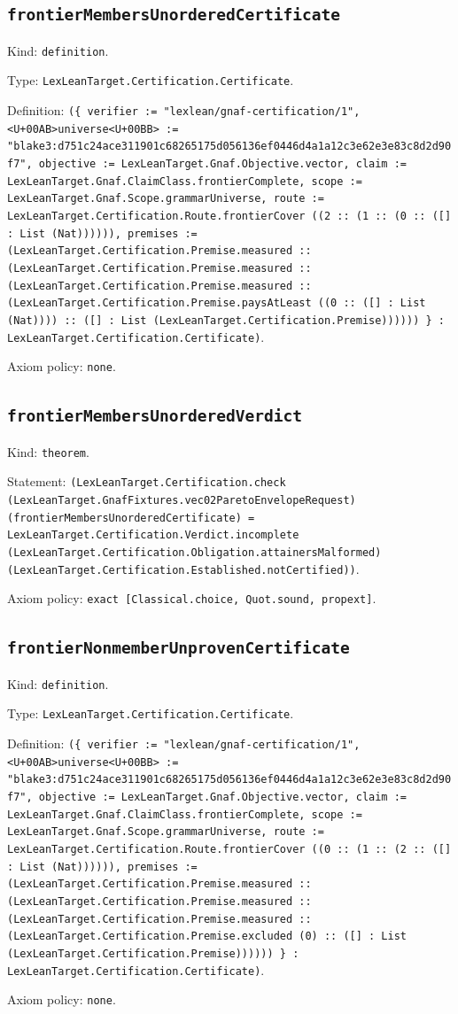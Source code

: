 \documentclass[11pt]{article}
\begin{document}
\subsection*{\texttt{frontierMembersUnorderedCertificate}}
\noindent Kind: \texttt{definition}.\par
\noindent Type: \texttt{LexLeanTarget.Certification.Certificate}.\par
\noindent Definition: \texttt{(\{ verifier := "lexlean/gnaf-certification/1", <U+00AB>universe<U+00BB> := "blake3:d751c24ace311901c68265175d056136ef0446d4a1a12c3e62e3e83c8d2d90f7", objective := LexLeanTarget.Gnaf.Objective.vector, claim := LexLeanTarget.Gnaf.ClaimClass.frontierComplete, scope := LexLeanTarget.Gnaf.Scope.grammarUniverse, route := LexLeanTarget.Certification.Route.frontierCover ((2 :: (1 :: (0 :: ([] : List (Nat)))))), premises := (LexLeanTarget.Certification.Premise.measured :: (LexLeanTarget.Certification.Premise.measured :: (LexLeanTarget.Certification.Premise.measured :: (LexLeanTarget.Certification.Premise.paysAtLeast ((0 :: ([] : List (Nat)))) :: ([] : List (LexLeanTarget.Certification.Premise)))))) \} : LexLeanTarget.Certification.Certificate)}.\par
\noindent Axiom policy: \texttt{none}.\par
\subsection*{\texttt{frontierMembersUnorderedVerdict}}
\noindent Kind: \texttt{theorem}.\par
\noindent Statement: \texttt{(LexLeanTarget.Certification.check (LexLeanTarget.GnafFixtures.vec02ParetoEnvelopeRequest) (frontierMembersUnorderedCertificate) = LexLeanTarget.Certification.Verdict.incomplete (LexLeanTarget.Certification.Obligation.attainersMalformed) (LexLeanTarget.Certification.Established.notCertified))}.\par
\noindent Axiom policy: \texttt{exact [Classical.choice, Quot.sound, propext]}.\par
\subsection*{\texttt{frontierNonmemberUnprovenCertificate}}
\noindent Kind: \texttt{definition}.\par
\noindent Type: \texttt{LexLeanTarget.Certification.Certificate}.\par
\noindent Definition: \texttt{(\{ verifier := "lexlean/gnaf-certification/1", <U+00AB>universe<U+00BB> := "blake3:d751c24ace311901c68265175d056136ef0446d4a1a12c3e62e3e83c8d2d90f7", objective := LexLeanTarget.Gnaf.Objective.vector, claim := LexLeanTarget.Gnaf.ClaimClass.frontierComplete, scope := LexLeanTarget.Gnaf.Scope.grammarUniverse, route := LexLeanTarget.Certification.Route.frontierCover ((0 :: (1 :: (2 :: ([] : List (Nat)))))), premises := (LexLeanTarget.Certification.Premise.measured :: (LexLeanTarget.Certification.Premise.measured :: (LexLeanTarget.Certification.Premise.measured :: (LexLeanTarget.Certification.Premise.excluded (0) :: ([] : List (LexLeanTarget.Certification.Premise)))))) \} : LexLeanTarget.Certification.Certificate)}.\par
\noindent Axiom policy: \texttt{none}.\par
\end{document}
